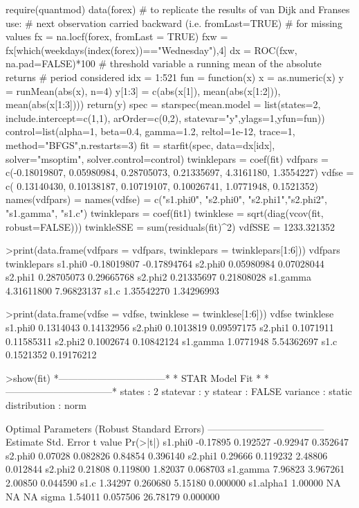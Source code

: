 \begin{Schunk}
\begin{Sinput}
require(quantmod)
data(forex)
# to replicate the results of van Dijk and Franses use:
# next observation carried backward (i.e. fromLast=TRUE)
# for missing values
fx = na.locf(forex, fromLast = TRUE)
fxw = fx[which(weekdays(index(forex))=="Wednesday"),4]
dx = ROC(fxw, na.pad=FALSE)*100
# threshold variable a running mean of the absolute returns
# period considered
idx = 1:521
fun = function(x){
x = as.numeric(x)
y = runMean(abs(x), n=4)
y[1:3] = c(abs(x[1]), mean(abs(x[1:2])), mean(abs(x[1:3])))
return(y)
}
spec = starspec(mean.model = list(states=2, include.intercept=c(1,1), 
arOrder=c(0,2), statevar="y",ylags=1,yfun=fun))
control=list(alpha=1, beta=0.4, gamma=1.2, reltol=1e-12, trace=1,
method="BFGS",n.restarts=3)
fit = starfit(spec, data=dx[idx], solver="msoptim", solver.control=control)
twinklepars = coef(fit)
vdfpars = c(-0.18019807, 0.05980984, 0.28705073, 0.21335697, 4.3161180, 1.3554227)
vdfse   = c( 0.13140430, 0.10138187, 0.10719107, 0.10026741, 1.0771948, 0.1521352)
names(vdfpars) = names(vdfse) = c("s1.phi0", "s2.phi0", "s2.phi1","s2.phi2",
"s1.gamma", "s1.c") twinklepars = coef(fit1)
twinklese = sqrt(diag(vcov(fit, robust=FALSE)))
twinkleSSE = sum(residuals(fit)^2)
vdfSSE = 1233.321352
\end{Sinput}
\begin{Soutput}
>print(data.frame(vdfpars = vdfpars, twinklepars = twinklepars[1:6]))
             vdfpars twinklepars
s1.phi0  -0.18019807 -0.17894764
s2.phi0   0.05980984  0.07028044
s2.phi1   0.28705073  0.29665768
s2.phi2   0.21335697  0.21808028
s1.gamma  4.31611800  7.96823137
s1.c      1.35542270  1.34296993

>print(data.frame(vdfse = vdfse, twinklese = twinklese[1:6]))
             vdfse  twinklese
s1.phi0  0.1314043 0.14132956
s2.phi0  0.1013819 0.09597175
s2.phi1  0.1071911 0.11585311
s2.phi2  0.1002674 0.10842124
s1.gamma 1.0771948 5.54362697
s1.c     0.1521352 0.19176212

>show(fit)
*---------------------------------*
*          STAR Model Fit         *
*---------------------------------*
states       : 2
statevar     : y
statear      : FALSE
variance     : static
distribution : norm


Optimal Parameters (Robust Standard Errors)
------------------------------------
           Estimate  Std. Error  t value Pr(>|t|)
s1.phi0    -0.17895    0.192527 -0.92947 0.352647
s2.phi0     0.07028    0.082826  0.84854 0.396140
s2.phi1     0.29666    0.119232  2.48806 0.012844
s2.phi2     0.21808    0.119800  1.82037 0.068703
s1.gamma    7.96823    3.967261  2.00850 0.044590
s1.c        1.34297    0.260680  5.15180 0.000000
s1.alpha1   1.00000          NA       NA       NA
sigma       1.54011    0.057506 26.78179 0.000000


\end{Soutput}
\end{Schunk}
